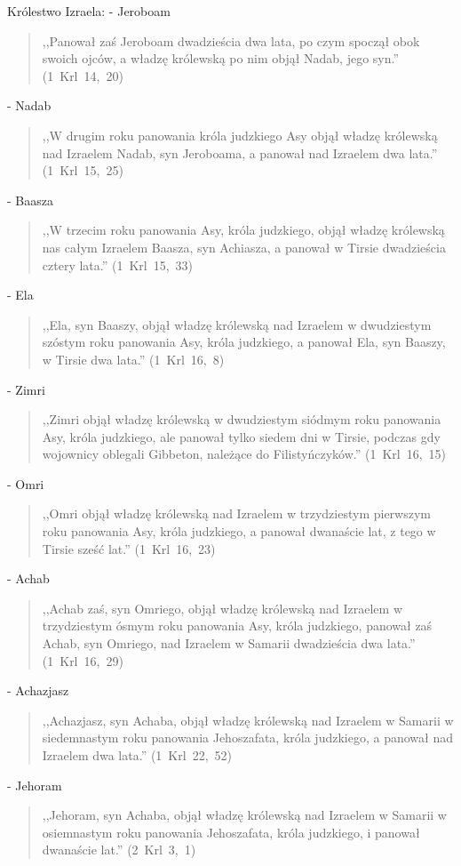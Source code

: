 \documentclass[10pt,a4paper,oneside]{article}
\begin{document}
Królestwo Izraela:
- Jeroboam
\begin{quote}
,,Panował zaś Jeroboam dwadzieścia dwa lata, po czym spoczął obok swoich ojców, a władzę królewską po nim objął Nadab, jego syn.'' \mbox{(1 Krl 14, 20)}
\end{quote}
- Nadab
\begin{quote}
,,W drugim roku panowania króla judzkiego Asy objął władzę królewską nad Izraelem Nadab, syn Jeroboama, a panował nad Izraelem dwa lata.'' \mbox{(1 Krl 15, 25)}
\end{quote}
- Baasza
\begin{quote}
,,W trzecim roku panowania Asy, króla judzkiego, objął władzę królewską nas całym Izraelem Baasza, syn Achiasza, a panował w Tirsie dwadzieścia cztery lata.'' \mbox{(1 Krl 15, 33)}
\end{quote}
- Ela
\begin{quote}
,,Ela, syn Baaszy, objął władzę królewską nad Izraelem w dwudziestym szóstym roku panowania Asy, króla judzkiego, a panował Ela, syn Baaszy, w Tirsie dwa lata.'' \mbox{(1 Krl 16, 8)}
\end{quote}
- Zimri
\begin{quote}
,,Zimri objął władzę królewską w dwudziestym siódmym roku panowania Asy, króla judzkiego, ale panował tylko siedem dni w Tirsie, podczas gdy wojownicy oblegali Gibbeton, należące do Filistyńczyków.'' \mbox{(1 Krl 16, 15)}
\end{quote}
- Omri
\begin{quote}
,,Omri objął władzę królewską nad Izraelem w trzydziestym pierwszym roku panowania Asy, króla judzkiego, a panował dwanaście lat, z tego w Tirsie sześć lat.'' \mbox{(1 Krl 16, 23)}
\end{quote}
- Achab
\begin{quote}
,,Achab zaś, syn Omriego, objął władzę królewską nad Izraelem w trzydziestym ósmym roku panowania Asy, króla judzkiego, panował zaś Achab, syn Omriego, nad Izraelem w Samarii dwadzieścia dwa lata.'' \mbox{(1 Krl 16, 29)}
\end{quote}
- Achazjasz
\begin{quote}
,,Achazjasz, syn Achaba, objął władzę królewską nad Izraelem w Samarii w siedemnastym roku panowania Jehoszafata, króla judzkiego, a panował nad Izraelem dwa lata.'' \mbox{(1 Krl 22, 52)}
\end{quote}
- Jehoram
\begin{quote}
,,Jehoram, syn Achaba, objął władzę królewską nad Izraelem w Samarii w osiemnastym roku panowania Jehoszafata, króla judzkiego, i panował dwanaście lat.'' \mbox{(2 Krl 3, 1)}
\end{quote}
\end{document}
